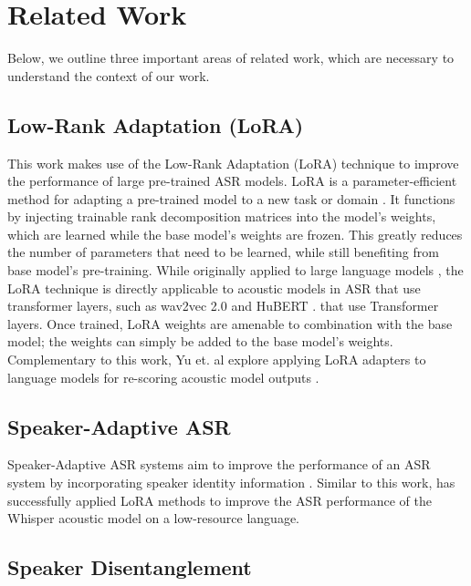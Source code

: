 \section{Related Work}

Below, we outline three important areas of related work, which are necessary to understand the context of our work.

\subsection{Low-Rank Adaptation (LoRA)}

This work makes use of the Low-Rank Adaptation (LoRA) technique to improve the performance of large pre-trained ASR models.
LoRA is a parameter-efficient method for adapting a pre-trained model to a new task or domain \cite{lora}.
It functions by injecting trainable rank decomposition matrices into the model's weights, which are learned while the base model's weights are frozen.
This greatly reduces the number of parameters that need to be learned, while still benefiting from base model's pre-training.
While originally applied to large language models \cite{lora}, the LoRA technique is directly applicable to acoustic models in ASR that use transformer layers, such as wav2vec 2.0 and HuBERT \cite{wav2vec2, hubert}.
that use Transformer \cite{transformer} layers.
Once trained, LoRA weights are amenable to combination with the base model; the weights can simply be added to the base model's weights.
Complementary to this work, Yu et. al explore applying LoRA adapters to language models for re-scoring acoustic model outputs \cite{loraonlm}.

\subsection{Speaker-Adaptive ASR}

Speaker-Adaptive ASR systems aim to improve the performance of an ASR system by incorporating speaker identity information \cite{speakeradaptation}.
Similar to this work, \cite{childspeech} has successfully applied LoRA methods to improve the ASR performance of the Whisper \cite{whisper} acoustic model on a low-resource language.
\cite{speakeradaptation}


\subsection{Speaker Disentanglement}

